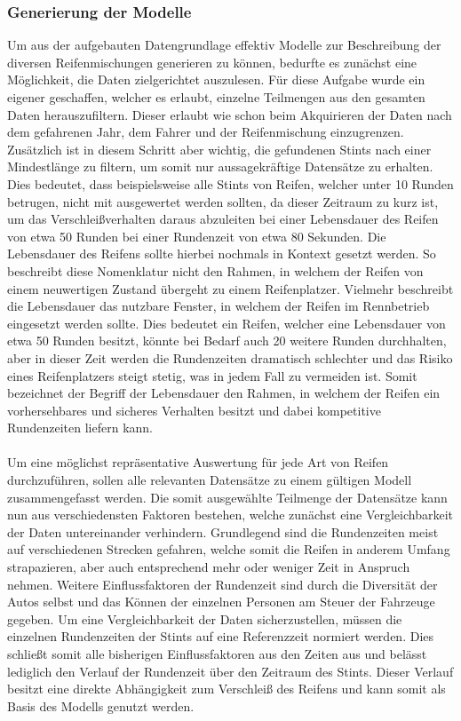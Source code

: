 \subsubsection{Generierung der Modelle}\label{sec:gen_models}
Um aus der aufgebauten Datengrundlage effektiv Modelle zur Beschreibung der diversen Reifenmischungen generieren zu können, bedurfte es zunächst eine Möglichkeit, die Daten zielgerichtet auszulesen. Für diese Aufgabe wurde ein eigener  geschaffen, welcher es erlaubt, einzelne Teilmengen aus den gesamten Daten herauszufiltern. Dieser erlaubt wie schon beim Akquirieren der Daten nach dem gefahrenen Jahr, dem Fahrer und der Reifenmischung einzugrenzen. Zusätzlich ist in diesem Schritt aber wichtig, die gefundenen Stints nach einer Mindestlänge zu filtern, um somit nur aussagekräftige Datensätze zu erhalten. Dies bedeutet, dass beispielsweise alle Stints von  Reifen, welcher unter 10 Runden betrugen, nicht mit ausgewertet werden sollten, da dieser Zeitraum zu kurz ist, um das Verschleißverhalten daraus abzuleiten bei einer Lebensdauer des Reifen von etwa 50 Runden bei einer Rundenzeit von etwa 80 Sekunden. Die Lebensdauer des Reifens sollte hierbei nochmals in Kontext gesetzt werden. So beschreibt diese Nomenklatur nicht den Rahmen, in welchem der Reifen von einem neuwertigen Zustand übergeht zu einem Reifenplatzer. Vielmehr beschreibt die Lebensdauer das nutzbare Fenster, in welchem der Reifen im Rennbetrieb eingesetzt werden sollte. Dies bedeutet ein Reifen, welcher eine Lebensdauer von etwa 50 Runden besitzt, könnte bei Bedarf auch 20 weitere Runden durchhalten, aber in dieser Zeit werden die Rundenzeiten dramatisch schlechter und das Risiko eines Reifenplatzers steigt stetig, was in jedem Fall zu vermeiden ist. Somit bezeichnet der Begriff der Lebensdauer den Rahmen, in welchem der Reifen ein vorhersehbares und sicheres Verhalten besitzt und dabei kompetitive Rundenzeiten liefern kann.\\\\
Um eine möglichst repräsentative Auswertung für jede Art von Reifen durchzuführen, sollen alle relevanten Datensätze zu einem gültigen Modell zusammengefasst werden. Die somit ausgewählte Teilmenge der Datensätze kann nun aus verschiedensten Faktoren bestehen, welche zunächst eine Vergleichbarkeit der Daten untereinander verhindern. Grundlegend sind die Rundenzeiten meist auf verschiedenen Strecken gefahren, welche somit die Reifen in anderem Umfang strapazieren, aber auch entsprechend mehr oder weniger Zeit in Anspruch nehmen. Weitere Einflussfaktoren der Rundenzeit sind durch die Diversität der Autos selbst und das Können der einzelnen Personen am Steuer der Fahrzeuge gegeben. Um eine Vergleichbarkeit der Daten sicherzustellen, müssen die einzelnen Rundenzeiten der Stints auf eine Referenzzeit normiert werden. Dies schließt somit alle bisherigen Einflussfaktoren aus den Zeiten aus und belässt lediglich den Verlauf der Rundenzeit über den Zeitraum des Stints. Dieser Verlauf besitzt eine direkte Abhängigkeit zum Verschleiß des Reifens und kann somit als Basis des Modells genutzt werden.
